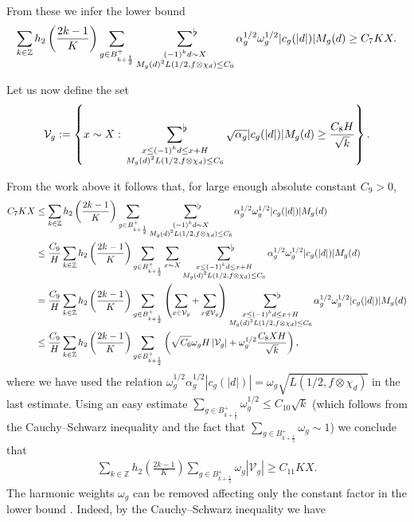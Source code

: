\documentclass[a4paper,10pt,twoside]{amsart}
\theoremstyle{definition}
\numberwithin{equation}{section}
\newcommand\Z{\mathbb{Z}}
\renewcommand\:{\colon}
\newcommand{\sumflat}{\mathop{{\sum}^{\raisebox{-3pt}{\makebox[0pt][l]{$\flat$}}}}}
\begin{document}
From these we infer the lower bound
\[\sum_{k\in\Z}h_2\left(\frac{2k-1}K\right)\sum_{g\in B_{k+\frac12}^+}\sumflat_{\substack{(-1)^kd\sim X\\
M_g(d)^2L(1/2,f\otimes\chi_{d})\leq C_6}}\alpha_g^{1/2}\omega_g^{1/2}|c_g(|d|)|M_g(d)\geq C_7KX.\]

Let us now define the set
\[\mathcal V_g:=\left\{x\sim X:\,\sumflat_{\substack{x\leq(-1)^kd\leq x+H\\
M_g(d)^2L(1/2,f\otimes\chi_{d})\leq C_6}}\sqrt{\alpha_g}|c_g(|d|)|M_g(d)\geq\frac{C_8 H}{\sqrt k}\right\}.\]

From the work above it follows that, for large enough absolute constant $C_9>0$,
\begin{align*}
C_7 KX &\leq\sum_{k\in\Z}h_2\left(\frac{2k-1}K\right)\sum_{g\in B_{k+\frac12}^+}\sumflat_{\substack{(-1)^kd\sim X\\
M_g(d)^2L(1/2,f\otimes\chi_{d})\leq C_6}}\alpha_g^{1/2}\omega_g^{1/2}|c_g(|d|)|M_g(d)\\
&\leq\frac{C_9}H\sum_{k\in\Z}h_2\left(\frac{2k-1}K\right)\sum_{g\in B_{k+\frac12}^+}\sum_{x\sim X}\sumflat_{\substack{x\leq (-1)^kd\leq x+H\\
M_g(d)^2L(1/2,f\otimes\chi_{d})\leq C_6}}\alpha_g^{1/2}\omega_g^{1/2}|c_g(|d|)|M_g(d)\\
&=\frac{C_9}H\sum_{k\in\Z}h_2\left(\frac{2k-1}K\right)\sum_{g\in B_{k+\frac12}^+}\left(\sum_{x\in\mathcal V_g}+\sum_{x\not\in\mathcal V_g}\right)\sumflat_{\substack{x\leq (-1)^kd\leq x+H\\
M_g(d)^2L(1/2,f\otimes\chi_{d})\leq C_6}}\alpha_g^{1/2}\omega_g^{1/2}|c_g(|d|)|M_g(d)\\
&\leq\frac{C_9}H\sum_{k\in\Z}h_2\left(\frac{2k-1}K\right)\sum_{g\in B_{k+\frac12}^+}\left(\sqrt{C_6}\omega_g H\left|\mathcal V_g\right|+\omega_g^{1/2}\frac{C_8 XH}{\sqrt k}\right),
\end{align*}
where we have used the relation $\omega_g^{1/2}\alpha_g^{1/2}|c_g(|d|)|=\omega_g\sqrt{L(1/2,f\otimes\chi_d)}$ in the last estimate. Using an easy estimate $\sum_{g\in B_{k+\frac12}^+}\omega_g^{1/2}\leq C_{10}\sqrt k$ (which follows from the Cauchy--Schwarz inequality and the fact that $\sum_{g\in B_{k+\frac12}^+}\omega_g\sim 1$) we conclude that
\begin{align}\label{lower-bound}
\sum_{k\in\Z}h_2\left(\frac{2k-1}K\right)\sum_{g\in B_{k+\frac12}^+}\omega_g\left|\mathcal V_g\right|\geq C_{11} KX.
\end{align}
The harmonic weights $\omega_g$ can be removed affecting only the constant factor in the lower bound \cite{Balkanova-Frolenkov2021, Iwaniec-Sarnak2000}. Indeed, by the Cauchy--Schwarz inequality we have
\end{document}
